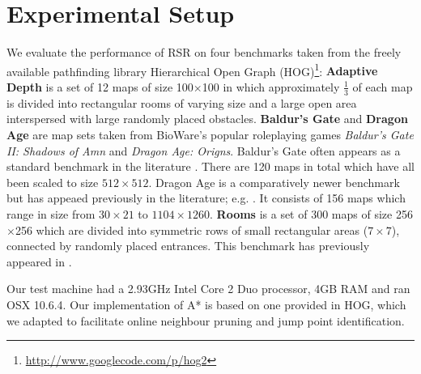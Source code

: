 \section{Experimental Setup}
We evaluate the performance of RSR on four benchmarks taken from the freely
available pathfinding library Hierarchical Open Graph
(HOG)\footnote{\url{http://www.googlecode.com/p/hog2}}: {\textbf{Adaptive Depth}
is a set of 12 maps of size 100$\times$100 in which approximately $\frac{1}{3}$
of each map is divided into rectangular rooms of varying size and a large
open area interspersed with large randomly placed obstacles.} {\textbf{Baldur's
Gate} and \textbf{Dragon Age} are map sets taken from BioWare's popular
roleplaying games \emph{Baldur's Gate II: Shadows of Amn} and \emph{Dragon Age:
Origns}.  Baldur's Gate often appears as a standard
benchmark in the literature \cite{bjornsson06,harabor10,pochter10}. 
There are 120 maps in total which have all been scaled to size $512\times512$.
Dragon Age is a comparatively newer benchmark but has appeaed previously in the
literature; e.g. \cite{sturtevant07}. It consists of 156 maps which range in size
from $30\times21$ to $1104\times1260$.}
{\textbf{Rooms} is a set of 300 maps of size
256$\times$256 which are divided into symmetric rows of small rectangular areas
($7\times7$), connected by randomly placed entrances. This benchmark has
previously appeared in \cite{pochter10}.}

Our test machine had a 2.93GHz Intel Core 2 Duo processor, 4GB RAM and ran OSX 
10.6.4.  Our implementation of A* is based on one provided in HOG, which we 
adapted to facilitate online neighbour pruning and jump point identification. 
